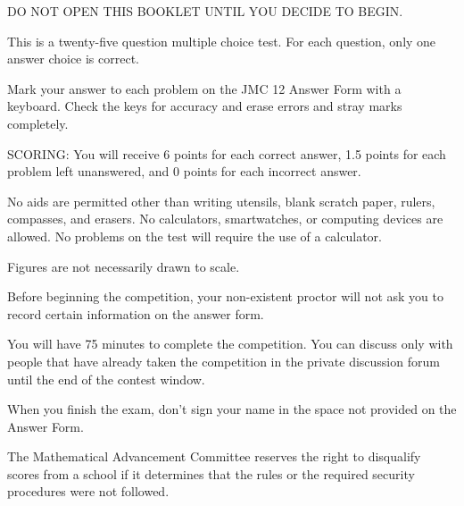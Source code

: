 \documentclass[10pt, twoside]{article}
\newcommand{\contestName}{JMC}
\newcommand{\contestNumber}{12}
\newcommand{\committeeName}{Mathematical Advancement Committee}
\begin{document}
\begin{justify}
\begin{enumerate}[noitemsep, nolistsep, leftmargin=*]

\small{
\item DO NOT OPEN THIS BOOKLET UNTIL YOU DECIDE TO BEGIN.
\item This is a twenty-five question multiple choice test. For each question, only one answer choice is correct.
\item Mark your answer to each problem on the {\contestName} {\contestNumber} Answer Form with a keyboard. Check the keys for accuracy and erase errors and stray marks completely.
\item SCORING: You will receive 6 points for each correct answer, 1.5 points for each problem left unanswered, and 0 points for each incorrect answer.
\item No aids are permitted other than writing utensils, blank scratch paper, rulers, compasses, and erasers. No calculators, smartwatches, or computing devices are allowed. No problems on the test will require the use of a calculator.
\item Figures are not necessarily drawn to scale.
\item Before beginning the competition, your non-existent proctor will not ask you to record certain information on the answer form. 
\item You will have 75 minutes to complete the competition. You can discuss only with people that have already taken the competition in the private discussion forum until the end of the contest window.
\item When you finish the exam, don't sign your name in the space not provided on the Answer Form.
}

\end{enumerate}

\vspace{-4mm}

\begin{center} \noindent\hrulefill \end{center}

\vspace{-5mm}

\small{
\begin{justify}
The {\committeeName} reserves the right to disqualify scores from a school if it determines that the rules or the required security procedures were not followed.
\end{justify}

}
\end{justify}
\end{document}
